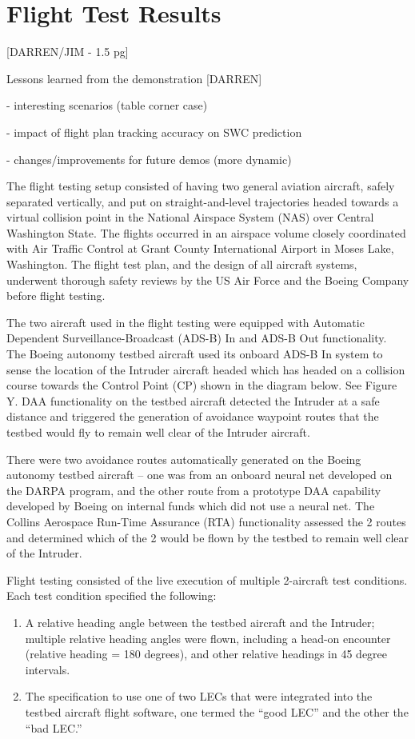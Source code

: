 \section{Flight Test Results}

[DARREN/JIM - 1.5 pg]

Lessons learned from the demonstration [DARREN]

- interesting scenarios (table corner case)

- impact of flight plan tracking accuracy on SWC prediction

- changes/improvements for future demos (more dynamic)

The flight testing setup consisted of having two general aviation aircraft, safely separated vertically, and put on straight-and-level trajectories headed towards a virtual collision point in the National Airspace System (NAS) over Central Washington State.  The flights occurred in an airspace volume closely coordinated with Air Traffic Control at Grant County International Airport in Moses Lake, Washington.  The flight test plan, and the design of all aircraft systems, underwent thorough safety reviews by the US Air Force and the Boeing Company before flight testing.

The two aircraft used in the flight testing were equipped with Automatic Dependent Surveillance-Broadcast (ADS-B) In and ADS-B Out functionality.  The Boeing autonomy testbed aircraft used its onboard ADS-B In system to sense the location of the Intruder aircraft headed which has headed on a collision course towards the Control Point (CP) shown in the diagram below.  See Figure Y.  DAA functionality on the testbed aircraft detected the Intruder at a safe distance and triggered the generation of avoidance waypoint routes that the testbed would fly to remain well clear of the Intruder aircraft.  

There were two avoidance routes automatically generated on the Boeing autonomy testbed aircraft – one was from an onboard neural net developed on the DARPA program, and the other route from a prototype DAA capability developed by Boeing on internal funds which did not use a neural net.
The Collins Aerospace Run-Time Assurance (RTA) functionality assessed the 2 routes and determined which of the 2 would be flown by the testbed to remain well clear of the Intruder.

Flight testing consisted of the live execution of multiple 2-aircraft test conditions.  Each test condition specified the following:
\begin{enumerate}
\item A relative heading angle between the testbed aircraft and the Intruder; multiple relative heading angles were flown, including a head-on encounter (relative heading = 180 degrees), and other relative headings in 45 degree intervals.
\item The specification to use one of two LECs that were integrated into the testbed aircraft flight software, one termed the ``good LEC'' and the other the ``bad LEC.''
\end{enumerate}


